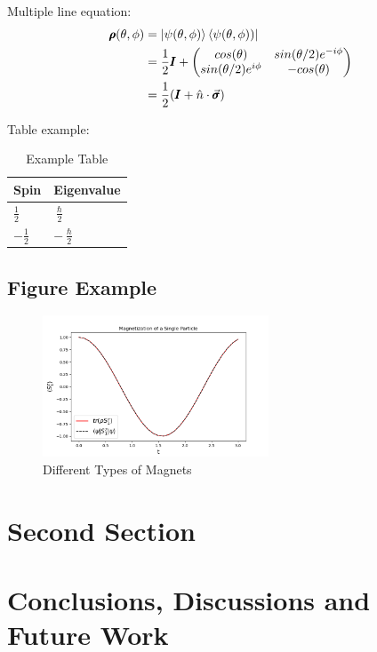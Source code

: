 ﻿\documentclass[12pt]{article}
\begin{document}
Multiple line equation:
\begin{equation}\label{eq:pareto mle2}
    \begin{aligned}
        \pmb{\rho}(\theta,\phi)&= \ket{\psi(\theta,\phi)}\bra{\psi(\theta,\phi))}
                  \\ & =\frac{1}{2}\pmb{I}+
        \begin{pmatrix}
               cos(\theta) & sin(\theta/2)e^{-i\phi}\\
               sin(\theta/2)e^{i\phi} & -cos(\theta)
        \end{pmatrix}
                  \\ & =\frac{1}{2}(\pmb{I}+\hat{n}\cdot\vec{\pmb{\sigma}})
    \end{aligned}
\end{equation} 

Table example:

\begin{table}[h!]
  \caption{Example Table}
  \centering
  \label{tab:tab1}
  \begin{tabularx}{\textwidth}{XX}
    \hline\hline
    Spin & Eigenvalue \\
    \hline\hline 
      $\frac{1}{2}$& $\frac{\hslash}{2}$\\
    \hline
    $-\frac{1}{2}$& $-\frac{\hslash}{2}$\\
    \hline
  \end{tabularx}
\end{table}


\subsection{Figure Example}


\begin{figure}[h!]
\centering
\includegraphics[width=0.6\textwidth]{Pics/spinmagne}
\caption{Different Types of Magnets}
\label{fig:fig1}
\end{figure}   








 

\section{Second Section}




\section{Conclusions, Discussions and Future Work}






\end{document}

